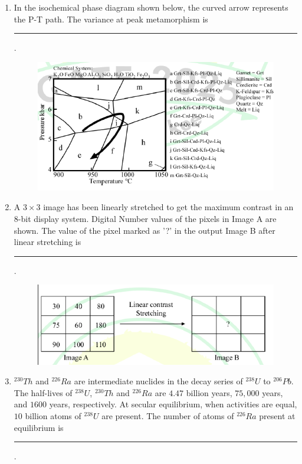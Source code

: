 \documentclass[journal,12pt,onecolumn]{IEEEtran}
\theoremstyle{remark}
\begin{document}
\begin{enumerate}
\item In the isochemical phase diagram shown below, the curved arrow represents the P-T path. The variance at peak metamorphism is \rule{3cm}{0.15mm}. 
\begin{figure}[H]
    \centering
    \includegraphics[width=0.8\columnwidth]{figs/fig11.png}
    \caption{}
    \label{fig:q62}
\end{figure}
\hfill{}

\item A $3 \times 3$ image  has been linearly stretched to get the maximum contrast in an $8$-bit display system. Digital Number  values of the pixels in Image A are shown. The value of the pixel marked as '?' in the output Image B after linear stretching is \rule{3cm}{0.15mm}. 
\begin{figure}[H]
    \centering
    \includegraphics[width=0.7\columnwidth]{figs/fig12.png}
    \caption{}
    \label{fig:q63}
\end{figure}
\hfill{}

\item $^{230}Th$ and $^{226}Ra$ are intermediate nuclides in the decay series of $^{238}U$ to $^{206}Pb$. The half-lives of $^{238}U$, $^{230}Th$ and $^{226}Ra$ are $4.47$ billion years, $75,000$ years, and $1600$ years, respectively. At secular equilibrium, when activities are equal, $10$ billion atoms of $^{238}U$ are present. The number of atoms of $^{226}Ra$ present at equilibrium is \rule{3cm}{0.15mm}.  \hfill{}


\end{enumerate}
\end{document}
